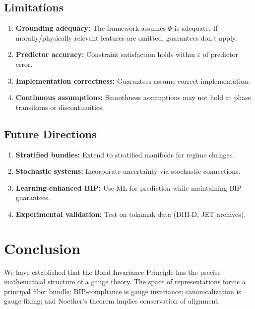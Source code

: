 \documentclass[11pt]{article}
\begin{document}
\subsection{Limitations}

\begin{enumerate}
    \item \textbf{Grounding adequacy:} The framework assumes $\Psi$ is adequate. If morally/physically
    relevant features are omitted, guarantees don't apply.

    \item \textbf{Predictor accuracy:} Constraint satisfaction holds within $\varepsilon$ of predictor error.

    \item \textbf{Implementation correctness:} Guarantees assume correct implementation.

    \item \textbf{Continuous assumptions:} Smoothness assumptions may not hold at phase transitions
    or discontinuities.
\end{enumerate}

\subsection{Future Directions}

\begin{enumerate}
    \item \textbf{Stratified bundles:} Extend to stratified manifolds for regime changes.
    \item \textbf{Stochastic systems:} Incorporate uncertainty via stochastic connections.
    \item \textbf{Learning-enhanced BIP:} Use ML for prediction while maintaining BIP guarantees.
    \item \textbf{Experimental validation:} Test on tokamak data (DIII-D, JET archives).
\end{enumerate}

\section{Conclusion}

We have established that the Bond Invariance Principle has the precise mathematical structure
of a gauge theory. The space of representations forms a principal fiber bundle; BIP-compliance
is gauge invariance; canonicalization is gauge fixing; and Noether's theorem implies conservation
of alignment.
\end{document}
